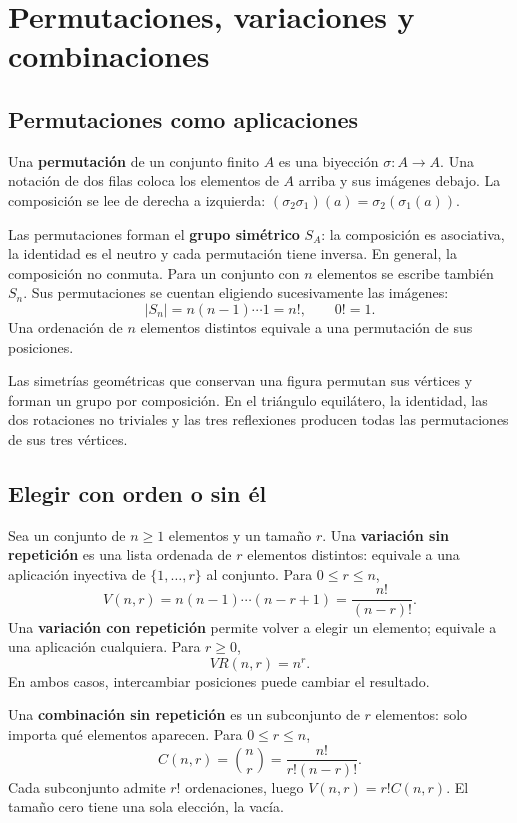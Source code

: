 \chapter{Permutaciones, variaciones y combinaciones}
\label{md:combinatoria}

\section{Permutaciones como aplicaciones}

Una \textbf{permutación} de un conjunto finito $A$ es una biyección
$\sigma:A\to A$. Una notación de dos filas coloca los elementos
de $A$ arriba y sus imágenes debajo.
La composición se lee de derecha a izquierda:
$(\sigma_2\sigma_1)(a)=\sigma_2(\sigma_1(a))$.

Las permutaciones forman el \textbf{grupo simétrico} $S_A$:
la composición es asociativa, la identidad es el neutro y cada
permutación tiene inversa. En general, la composición no conmuta.
Para un conjunto con $n$ elementos se escribe también $S_n$.
Sus permutaciones se cuentan eligiendo sucesivamente las imágenes:
\[
 |S_n|=n(n-1)\cdots1=n!,\qquad 0!=1.
\]
Una ordenación de $n$ elementos distintos equivale a una permutación
de sus posiciones.

Las simetrías geométricas que conservan una figura permutan sus
vértices y forman un grupo por composición. En el triángulo equilátero,
la identidad, las dos rotaciones no triviales y las tres reflexiones
producen todas las permutaciones de sus tres vértices.

\section{Elegir con orden o sin él}

Sea un conjunto de $n\ge1$ elementos y un tamaño $r$.
Una \textbf{variación sin repetición} es una lista ordenada de $r$
elementos distintos: equivale a una aplicación inyectiva de
$\{1,\ldots,r\}$ al conjunto. Para $0\le r\le n$,
\[
 V(n,r)=n(n-1)\cdots(n-r+1)=\frac{n!}{(n-r)!}.
\]
Una \textbf{variación con repetición} permite volver a elegir un
elemento; equivale a una aplicación cualquiera. Para $r\ge0$,
\[
 VR(n,r)=n^r.
\]
En ambos casos, intercambiar posiciones puede cambiar el resultado.

Una \textbf{combinación sin repetición} es un subconjunto de $r$
elementos: solo importa qué elementos aparecen. Para $0\le r\le n$,
\[
 C(n,r)=\binom nr=\frac{n!}{r!(n-r)!}.
\]
Cada subconjunto admite $r!$ ordenaciones, luego $V(n,r)=r!C(n,r)$.
El tamaño cero tiene una sola elección, la vacía.

